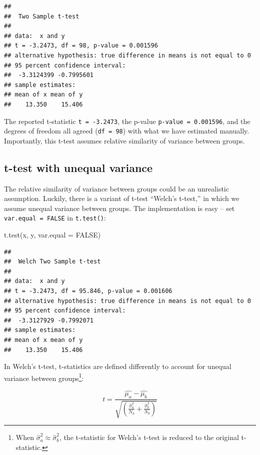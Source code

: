 \documentclass[
]{book}
\newenvironment{Shaded}{\begin{snugshade}}{\end{snugshade}}
\newcommand{\AttributeTok}[1]{\textcolor[rgb]{0.77,0.63,0.00}{#1}}
\newcommand{\ConstantTok}[1]{\textcolor[rgb]{0.00,0.00,0.00}{#1}}
\newcommand{\FunctionTok}[1]{\textcolor[rgb]{0.00,0.00,0.00}{#1}}
\newcommand{\NormalTok}[1]{#1}
\begin{document}
\begin{verbatim}
## 
##  Two Sample t-test
## 
## data:  x and y
## t = -3.2473, df = 98, p-value = 0.001596
## alternative hypothesis: true difference in means is not equal to 0
## 95 percent confidence interval:
##  -3.3124399 -0.7995601
## sample estimates:
## mean of x mean of y 
##    13.350    15.406
\end{verbatim}

The reported t-statistic \texttt{t\ =\ -3.2473}, the p-value \texttt{p-value\ =\ 0.001596}, and the degrees of freedom all agreed (\texttt{df\ =\ 98}) with what we have estimated manually. Importantly, this t-test assumes relative similarity of variance between groups.

\hypertarget{t-test-with-unequal-variance}{%
\subsection{t-test with unequal variance}\label{t-test-with-unequal-variance}}

The relative similarity of variance between groups could be an unrealistic assumption. Luckily, there is a variant of t-test ``Welch's t-test,'' in which we assume unequal variance between groups. The implementation is easy -- set \texttt{var.equal\ =\ FALSE} in \texttt{t.test()}:

\begin{Shaded}
\begin{Highlighting}[]
\FunctionTok{t.test}\NormalTok{(x, y, }\AttributeTok{var.equal =} \ConstantTok{FALSE}\NormalTok{)}
\end{Highlighting}
\end{Shaded}

\begin{verbatim}
## 
##  Welch Two Sample t-test
## 
## data:  x and y
## t = -3.2473, df = 95.846, p-value = 0.001606
## alternative hypothesis: true difference in means is not equal to 0
## 95 percent confidence interval:
##  -3.3127929 -0.7992071
## sample estimates:
## mean of x mean of y 
##    13.350    15.406
\end{verbatim}

In Welch's t-test, t-statistics are defined differently to account for unequal variance between groups\footnote{When \(\hat{\sigma}^2_a \approx \hat{\sigma}_b^2\), the t-statistic for Welch's t-test is reduced to the original t-statistic.}:

\[
t = \frac{\hat{\mu_a} - \hat{\mu_b}}{\sqrt{\left(\frac{\hat{\sigma}^2_a}{N_a} + \frac{\hat{\sigma}^2_b}{N_b}\right)}}
\]
\end{document}
